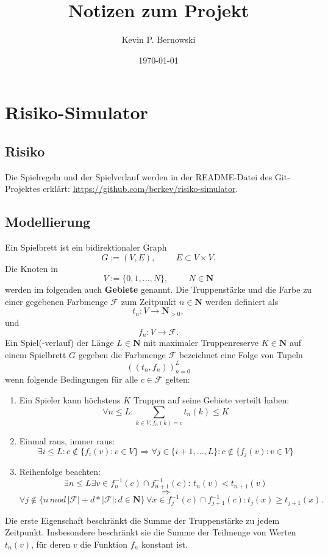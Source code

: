 \documentclass[12pt, letterpaper]{article}
\title{Notizen zum Projekt}
\author{Kevin P. Bernowski}
\date{\today}
\begin{document}
\maketitle
\tableofcontents
\section{Risiko-Simulator}
    \subsection{Risiko}

    Die Spielregeln und der Spielverlauf werden in der README-Datei des Git-Projektes erklärt: \url{https://github.com/berkev/risiko-simulator}.

    
    \subsection{Modellierung}

    Ein Spielbrett ist ein bidirektionaler Graph 
    \[G := (V,E), \hspace{1cm} E\subset V\times V.\]
    Die Knoten in 
    \[V :=\{0,1,...,N\}, \hspace{1cm} N \in \mathbf{N} \]
    werden im folgenden auch \textbf{Gebiete} genannt.
    \newline
    Die Truppenstärke und die Farbe zu einer gegebenen Farbmenge $\mathcal{F}$ zum Zeitpunkt $n\in\mathbf{N}$ werden definiert als
    \[ t_{n}:V\rightarrow \mathbf{N}_{>0},
    \] und 
    \[ f_{n}:V\rightarrow \mathcal{F}.\]
    \newline
    Ein Spiel(-verlauf) der Länge $L\in\mathbf{N}$ mit maximaler Truppenreserve $K\in\mathbf{N}$ auf einem Spielbrett $G$ gegeben die Farbmenge $\mathcal{F}$  bezeichnet eine Folge von Tupeln 
    \[((t_{n},f_{n}))_{n=0}^{L}\]
    wenn folgende Bedingungen für alle $c\in\mathcal{F}$ gelten:
    \begin{enumerate}
        \item Ein Spieler kann höchstens $K$ Truppen auf seine Gebiete verteilt haben:
        \[\forall n\leq L: \sum_{k\in V: f_{n}(k)=c}t_n(k) \leq K\]
        \item Einmal raus, immer raus:
        \[\exists i\leq L: c \notin \{f_{i}(v) : v\in V\} \Rightarrow \forall j\in\{i+1,...,L\}:c \notin \{f_{j}(v) : v\in V\} \]
        \item Reihenfolge beachten:
        \[\exists n\leq L \exists v\in f_{n}^{-1}(c)\cap f_{n+1}^{-1}(c):\, t_{n}(v)<t_{n+1}(v) \]\[\Rightarrow \]
        \[ \forall j\notin\{n\, mod\, |\mathcal{F}| + d * |\mathcal{F}| : d \in\mathbf{N}\}\,\forall x \in f_{j}^{-1}(c)\cap f_{j+1}^{-1}(c) : t_{j}(x)\geq t_{j+1}(x).\]
        
    \end{enumerate}
    Die erste Eigenschaft beschränkt die Summe der Truppenstärke zu jedem Zeitpunkt. Insbesondere beschränkt sie die Summe der Teilmenge von Werten $t_{n}(v)$, für deren $v$ die Funktion $f_{n}$ konstant ist.
    
\end{document}
